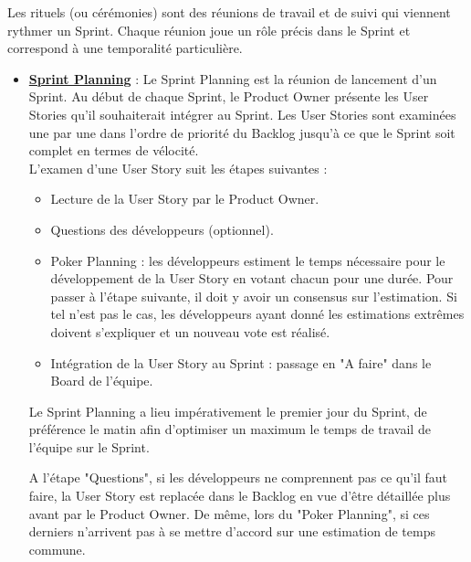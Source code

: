 Les rituels (ou cérémonies) sont des réunions de travail et de suivi qui viennent rythmer un Sprint. Chaque réunion joue un rôle précis dans le Sprint et correspond à une temporalité particulière.
\begin{itemize}
    \item \textbf{\underline{Sprint Planning}} : Le Sprint Planning est la réunion de lancement d'un Sprint. Au début de chaque Sprint, le Product Owner présente les User Stories qu'il souhaiterait intégrer au Sprint. Les User Stories sont examinées une par une dans l'ordre de priorité du Backlog jusqu'à ce que le Sprint soit complet en termes de vélocité.\\
    L'examen d'une User Story suit les étapes suivantes :
\begin{itemize}
    \item Lecture de la User Story par le Product Owner.
    \item Questions des développeurs (optionnel).
    \item Poker Planning : les développeurs estiment le temps nécessaire pour le développement de la User Story en votant chacun pour une durée. Pour passer à l'étape suivante, il doit y avoir un consensus sur l'estimation. Si tel n'est pas le cas, les développeurs ayant donné les estimations extrêmes doivent s'expliquer et un nouveau vote est réalisé.
    \item Intégration de la User Story au Sprint : passage en "A faire" dans le Board de l'équipe.
\end{itemize}
\begin{beware}[borderline west={5pt}{0pt}{olive3}, coltitle={olive3}, title=Note : ]
    Le Sprint Planning a lieu impérativement le premier jour du Sprint, de préférence le matin afin d'optimiser un maximum le temps de travail de l'équipe sur le Sprint.
\end{beware}
    \begin{beware}[title=Remarque : ]
    A l'étape "Questions", si les développeurs ne comprennent pas ce qu'il faut faire, la User Story est replacée dans le Backlog en vue d'être détaillée plus avant par le Product Owner.
De même, lors du "Poker Planning", si ces derniers n'arrivent pas à se mettre d'accord sur une estimation de temps commune.
\end{beware}


\end{itemize}
